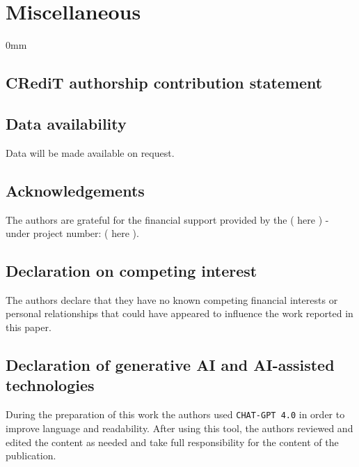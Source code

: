 \documentclass[./main.tex]{subfiles}
\begin{document}
\section*{Miscellaneous}
{}
\label{misc}

\begin{adjustwidth}{\bodytab}{0mm}

\subsection*{CRediT authorship contribution statement}

\noindent 

\subsection*{Data availability}

\noindent Data will be made available on request.

\subsection*{Acknowledgements}

\noindent The authors are grateful for the financial support provided by the ( here ) - under project number: ( here ).

\subsection*{Declaration on competing interest}

\noindent The authors declare that they have no known competing financial interests or personal relationships that could have appeared to influence the work reported in this paper.

\subsection*{Declaration of generative AI and AI-assisted technologies}

\noindent During the preparation of this work the authors used \texttt{CHAT-GPT 4.0} in order to improve language and readability. After using this tool, the authors reviewed and edited the content as needed and take full responsibility for the content of the publication.

\end{adjustwidth}
\end{document}

